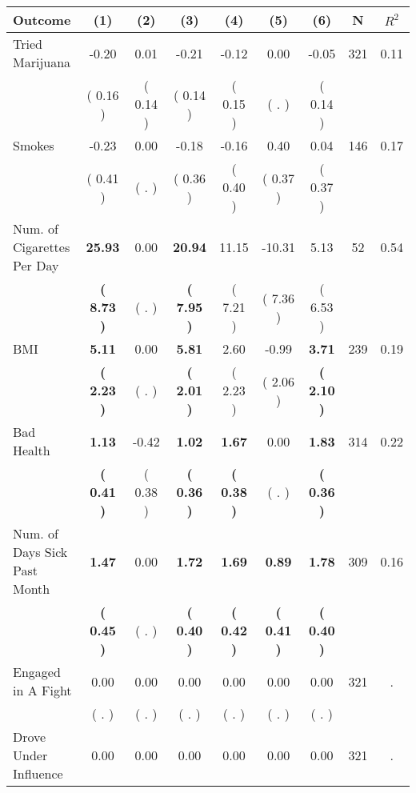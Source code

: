 \begin{tabular}{lcccccccc}
\toprule
 \textbf{Outcome} & \textbf{(1)} & \textbf{(2)} & \textbf{(3)} & \textbf{(4)} & \textbf{(5)} & \textbf{(6)} & \textbf{N} & \textbf{$ R^2$} \\
\midrule
Tried Marijuana &     -0.20 &      0.01 &     -0.21 &     -0.12 &      0.00 &     -0.05 & 321 &       0.11 \\ 
 & (     0.16 ) & (     0.14 ) & (     0.14 ) & (     0.15 ) & (        . ) & (     0.14 ) & \\
Smokes &     -0.23 &      0.00 &     -0.18 &     -0.16 &      0.40 &      0.04 & 146 &       0.17 \\ 
 & (     0.41 ) & (        . ) & (     0.36 ) & (     0.40 ) & (     0.37 ) & (     0.37 ) & \\
Num. of Cigarettes Per Day & \textbf{    25.93} &      0.00 & \textbf{    20.94} &     11.15 &    -10.31 &      5.13 & 52 &       0.54 \\ 
 & \textbf{(     8.73 )} & (        . ) & \textbf{(     7.95 )} & (     7.21 ) & (     7.36 ) & (     6.53 ) & \\
BMI & \textbf{     5.11} &      0.00 & \textbf{     5.81} &      2.60 &     -0.99 & \textbf{     3.71} & 239 &       0.19 \\ 
 & \textbf{(     2.23 )} & (        . ) & \textbf{(     2.01 )} & (     2.23 ) & (     2.06 ) & \textbf{(     2.10 )} & \\
Bad Health & \textbf{     1.13} &     -0.42 & \textbf{     1.02} & \textbf{     1.67} &      0.00 & \textbf{     1.83} & 314 &       0.22 \\ 
 & \textbf{(     0.41 )} & (     0.38 ) & \textbf{(     0.36 )} & \textbf{(     0.38 )} & (        . ) & \textbf{(     0.36 )} & \\
Num. of Days Sick Past Month & \textbf{     1.47} &      0.00 & \textbf{     1.72} & \textbf{     1.69} & \textbf{     0.89} & \textbf{     1.78} & 309 &       0.16 \\ 
 & \textbf{(     0.45 )} & (        . ) & \textbf{(     0.40 )} & \textbf{(     0.42 )} & \textbf{(     0.41 )} & \textbf{(     0.40 )} & \\
Engaged in A Fight &      0.00 &      0.00 &      0.00 &      0.00 &      0.00 &      0.00 & 321 &          . \\ 
 & (        . ) & (        . ) & (        . ) & (        . ) & (        . ) & (        . ) & \\
Drove Under Influence &      0.00 &      0.00 &      0.00 &      0.00 &      0.00 &      0.00 & 321 &          . \\ 

\end{tabular}

